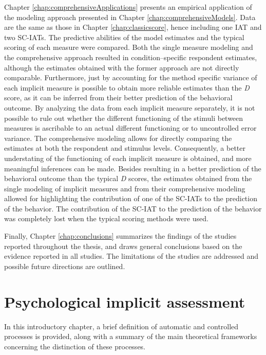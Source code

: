 \documentclass[12pt]{book}
\begin{document}
Chapter \ref{chap:comprehensiveApplications} presents an empirical application of the modeling approach presented in Chapter \ref{chap:comprehensiveModels}. Data are the same as those in Chapter \ref{chap:classicscore}, hence including one IAT and two SC-IATs. The predictive abilities of the  model estimates and the typical scoring of each measure were compared.
Both the single measure modeling and the comprehensive approach resulted in condition--specific respondent estimates, although the estimates obtained with the former approach are not directly comparable. 
Furthermore, just by accounting for the method specific variance of each implicit measure is possible to obtain more reliable estimates than the \emph{D} score, as it can be inferred from their better prediction of the behavioral outcome. 
By analyzing the data from each implicit measure separately, it is not possible to rule out whether the different functioning of the stimuli between measures is ascribable to an actual different functioning or to uncontrolled error variance. 
The comprehensive modeling allows for directly comparing the estimates at both the respondent and stimulus levels. Consequently, a better understating of the functioning of each implicit measure is obtained, and more meaningful inferences can be made.  
	Besides resulting in a better prediction of the behavioral outcome than the typical \emph{D} scores, the estimates obtained from the single modeling of implicit measures and from their comprehensive modeling allowed for highlighting the contribution of one of the SC-IATs to the prediction of the behavior. The contribution of the SC-IAT to the prediction of the behavior was completely lost when the typical scoring methods were used. 
	
	
	Finally, Chapter \ref{chap:conclusions} summarizes the findings of the studies reported throughout the thesis, and draws general conclusions based on the evidence reported in all studies. The limitations of the studies are addressed and possible future directions are outlined. 


	\mainmatter
	\thispagestyle{empty}

\newpage

\chapter[Psychological implicit assessment]{Psychological implicit assessment} \label{chap:intro}

In this introductory chapter, a brief definition of automatic and controlled processes is provided, along with a summary of the main theoretical frameworks concerning the distinction of these processes. 
\end{document}
